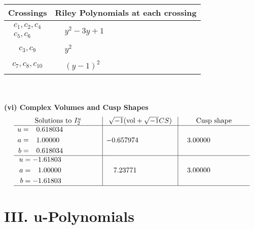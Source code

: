\documentclass[1p]{elsarticle_modified}
\theoremstyle{definition}
\newcommand{\I}{\sqrt{-1}}
\begin{document}
\begin{tabular}{m{50pt}|m{274pt}}
Crossings & \hspace{64pt}Riley Polynomials at each crossing \\
\hline $$\begin{aligned}c_{1},c_{2},c_{4}\\c_{5},c_{6}\end{aligned}$$&$\begin{aligned}
&y^2-3 y+1
\end{aligned}$\\
\hline $$\begin{aligned}c_{3},c_{9}\end{aligned}$$&$\begin{aligned}
&y^2
\end{aligned}$\\
\hline $$\begin{aligned}c_{7},c_{8},c_{10}\end{aligned}$$&$\begin{aligned}
&(y-1)^2
\end{aligned}$\\
\hline
\end{tabular}\\~\\
\newpage\flushleft \textbf{(vi) Complex Volumes and Cusp Shapes}
$$\begin{array}{c|c|c}  
\text{Solutions to }I^u_{2}& \I (\text{vol} + \sqrt{-1}CS) & \text{Cusp shape}\\
 \hline 
\begin{aligned}
u &= \phantom{-}0.618034\phantom{ +0.000000I} \\
a &= \phantom{-}1.00000\phantom{ +0.000000I} \\
b &= \phantom{-}0.618034\phantom{ +0.000000I}\end{aligned}
 & -0.657974\phantom{ +0.000000I} & \phantom{-}3.00000\phantom{ +0.000000I} \\ \hline\begin{aligned}
u &= -1.61803\phantom{ +0.000000I} \\
a &= \phantom{-}1.00000\phantom{ +0.000000I} \\
b &= -1.61803\phantom{ +0.000000I}\end{aligned}
 & \phantom{-}7.23771\phantom{ +0.000000I} & \phantom{-}3.00000\phantom{ +0.000000I}\\
 \hline 
 \end{array}$$\newpage
\newpage\renewcommand{\arraystretch}{1}
\centering \section*{ III. u-Polynomials}
\end{document}
